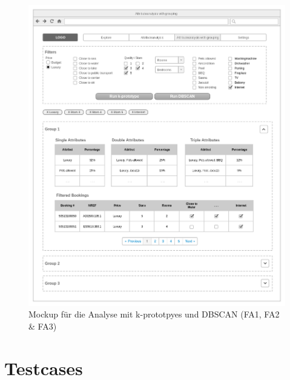 \begin{figure}[H]
	\RawFloats
	\centering
	\includegraphics[width=1\textwidth]{images/wireframe-clustering}
	\caption{Mockup für die Analyse mit k-prototpyes und DBSCAN (FA1, FA2 \& FA3)}
	\label{fig:konzept:mockups:apriori}
\end{figure}

\section{Testcases}
\label{sec:recherche:testcases}
